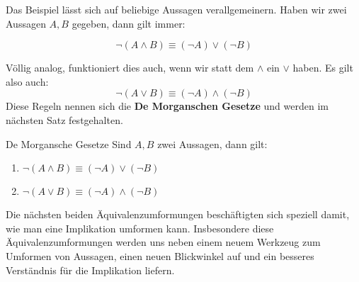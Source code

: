 \documentclass[../../main.tex]{subfiles}
\begin{document}
     Das Beispiel lässt sich auf beliebige Aussagen verallgemeinern. Haben wir zwei Aussagen $A,B$ gegeben, dann gilt immer:
     
     \[\lnot( A \land B) \equiv (\lnot A) \lor (\lnot B)\]
     
     Völlig analog, funktioniert dies auch, wenn wir 
     statt dem $\land$ ein $\lor$ haben. Es gilt also auch:
     \[\lnot( A \lor B) \equiv (\lnot A) \land (\lnot B)\]
      Diese Regeln nennen sich 
     die \textbf{De Morganschen Gesetze} und werden im nächsten Satz festgehalten.
     
    \begin{theorem}{De Morgansche Gesetze}
        Sind $A,B$ zwei Aussagen, dann gilt:
        \begin{enumerate}
            \item $\lnot( A \land B) \equiv (\lnot A) \lor (\lnot B)$
            \item $\lnot( A \lor B) \equiv (\lnot A) \land (\lnot B)$
        \end{enumerate}
    \end{theorem}
    
    Die nächsten beiden Äquivalenzumformungen beschäftigten sich speziell damit, wie 
    man eine Implikation umformen kann. Insbesondere diese Äquivalenzumformungen werden
     uns neben
    einem neuem Werkzeug zum Umformen von Aussagen,
    einen neuen
    Blickwinkel auf und ein besseres Verständnis für die Implikation liefern.
    
\end{document}

